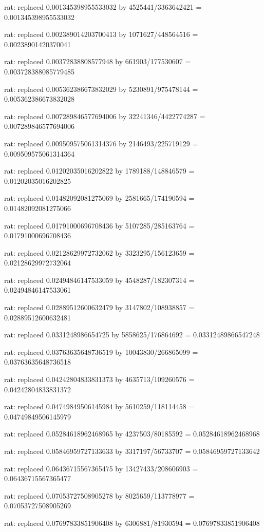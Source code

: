 \documentclass[a4paper,10pt]{article}
\begin{document}
\begin{eulernotebook}
\begin{eulercomment}
\begin{eulercomment}
\begin{eulercomment}
\begin{eulercomment}
\begin{eulercomment}
\begin{eulercomment}
\begin{eulercomment}
\begin{eulercomment}
\begin{eulercomment}
\begin{eulercomment}
\begin{eulercomment}
\begin{eulercomment}
\begin{eulercomment}
\begin{eulercomment}
\begin{eulercomment}
\begin{eulercomment}
\begin{euleroutput}
  rat: replaced 0.001345398955533032 by 4525441/3363642421 = 0.001345398955533032
  
  rat: replaced 0.002389014203700413 by 1071627/448564516 = 0.00238901420370041
  
  rat: replaced 0.00372838808577948 by 661903/177530607 = 0.003728388085779485
  
  rat: replaced 0.005362386673832029 by 5230891/975478144 = 0.005362386673832028
  
  rat: replaced 0.007289846577694006 by 32241346/4422774287 = 0.007289846577694006
  
  rat: replaced 0.009509575061314376 by 2146493/225719129 = 0.009509575061314364
  
  rat: replaced 0.01202035016202822 by 1789188/148846579 = 0.01202035016202825
  
  rat: replaced 0.01482092081275069 by 2581665/174190594 = 0.01482092081275066
  
  rat: replaced 0.01791000696708436 by 5107285/285163764 = 0.01791000696708436
  
  rat: replaced 0.02128629972732062 by 3323295/156123659 = 0.02128629972732064
  
  rat: replaced 0.02494846147533059 by 4548287/182307314 = 0.02494846147533061
  
  rat: replaced 0.02889512600632479 by 3147802/108938857 = 0.02889512600632481
  
  rat: replaced 0.0331248986654725 by 5858625/176864692 = 0.03312489866547248
  
  rat: replaced 0.03763635648736519 by 10043830/266865099 = 0.03763635648736518
  
  rat: replaced 0.04242804833831373 by 4635713/109260576 = 0.04242804833831372
  
  rat: replaced 0.04749849506145984 by 5610259/118114458 = 0.04749849506145979
  
  rat: replaced 0.05284618962468965 by 4237503/80185592 = 0.05284618962468968
  
  rat: replaced 0.05846959727133633 by 3317197/56733707 = 0.05846959727133642
  
  rat: replaced 0.06436715567365475 by 13427433/208606903 = 0.06436715567365477
  
  rat: replaced 0.07053727508905278 by 8025659/113778977 = 0.07053727508905269
  
  rat: replaced 0.07697833851906408 by 6306881/81930594 = 0.07697833851906408
  

\end{euleroutput}
\end{eulercomment}
\end{eulercomment}
\end{eulercomment}
\end{eulercomment}
\end{eulercomment}
\end{eulercomment}
\end{eulercomment}
\end{eulercomment}
\end{eulercomment}
\end{eulercomment}
\end{eulercomment}
\end{eulercomment}
\end{eulercomment}
\end{eulercomment}
\end{eulercomment}
\end{eulercomment}
\end{eulernotebook}
\end{document}
